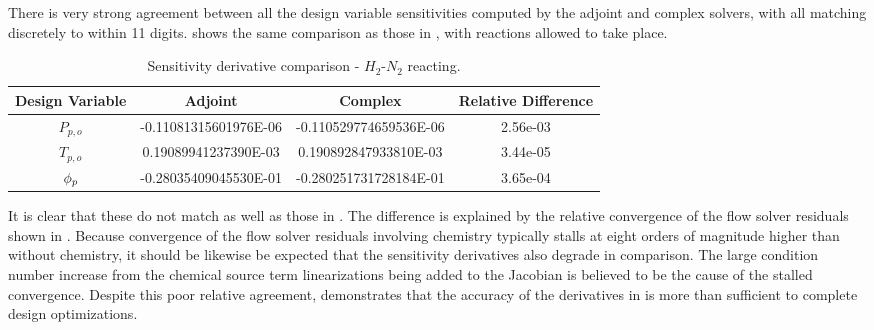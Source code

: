 There is very strong agreement between all the design variable sensitivities
computed by the adjoint and complex solvers, with all matching discretely to
within 11 digits.   shows the same comparison as
those in , with reactions allowed to take place.
\begin{table}[h]
  \centering
  \caption{Sensitivity derivative comparison - $H_2$-$N_2$ reacting.}
  \begin{tabular}{c|c|c|c}
    Design Variable & Adjoint & Complex & Relative Difference\\
    \hline
    $P_{p,o}$ & -0.11081315601976E-06 & -0.110529774659536E-06 & 2.56e-03 \\
    $T_{p,o}$ &  0.19089941237390E-03 &  0.190892847933810E-03 & 3.44e-05 \\
    $\phi_p$     & -0.28035409045530E-01 & -0.280251731728184E-01 & 3.65e-04
  \end{tabular}
  \label{tab:react-deriv-check}
\end{table}
It is clear that these do not match as well as those in
.  The difference is explained
by the relative convergence of the flow solver residuals shown in
.  Because convergence of the flow solver residuals
involving chemistry typically stalls at eight orders of magnitude higher than
without chemistry, it should be likewise be expected that the sensitivity
derivatives also degrade in comparison.  The large condition number increase
from the chemical source term linearizations being added to the Jacobian is
believed to be the cause of the stalled convergence. Despite this poor relative
agreement,  demonstrates that the accuracy of
the derivatives in  is more than sufficient to
complete design optimizations.
